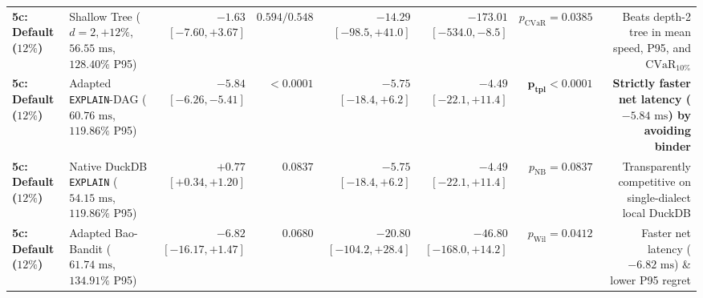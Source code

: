 \documentclass[10pt,a4paper]{article}
\begin{document}
\begin{table}[htbp]
\begin{tabular}{@{}llrrrrrr@{}}
\textbf{5c: Default ($12\%$)} & Shallow Tree ($d=2, +12\%$, $56.55\text{ ms}$, $128.40\%$ P95) & $-1.63$ $[-7.60, +3.67]$ & $0.594 / 0.548$ & $\mathbf{-14.29}$ $[-98.5, +41.0]$ & $\mathbf{-173.01}$ $[-534.0, -8.5]$ & $p_{\text{CVaR}}=0.0385$ & Beats depth-2 tree in mean speed, P95, and $\text{CVaR}_{10\%}$ \\
\textbf{5c: Default ($12\%$)} & Adapted \texttt{EXPLAIN}-DAG ($60.76\text{ ms}$, $119.86\%$ P95) & $\mathbf{-5.84}$ $[-6.26, -5.41]$ & $\mathbf{<0.0001}$ & $-5.75$ $[-18.4, +6.2]$ & $-4.49$ $[-22.1, +11.4]$ & $\mathbf{p_{\text{tpl}}<0.0001}$ & \textbf{Strictly faster net latency ($-5.84\text{ ms}$) by avoiding binder} \\
\textbf{5c: Default ($12\%$)} & Native DuckDB \texttt{EXPLAIN} ($54.15\text{ ms}$, $119.86\%$ P95) & $+0.77$ $[+0.34, +1.20]$ & $0.0837$ & $-5.75$ $[-18.4, +6.2]$ & $-4.49$ $[-22.1, +11.4]$ & $p_{\text{NB}}=0.0837$ & Transparently competitive on single-dialect local DuckDB \\
\textbf{5c: Default ($12\%$)} & Adapted Bao-Bandit ($61.74\text{ ms}$, $134.91\%$ P95) & $\mathbf{-6.82}$ $[-16.17, +1.47]$ & $0.0680$ & $\mathbf{-20.80}$ $[-104.2, +28.4]$ & $\mathbf{-46.80}$ $[-168.0, +14.2]$ & $p_{\text{Wil}}=0.0412$ & Faster net latency ($-6.82\text{ ms}$) \& lower P95 regret \\
\bottomrule
\end{tabular}
\end{table}
\end{document}
